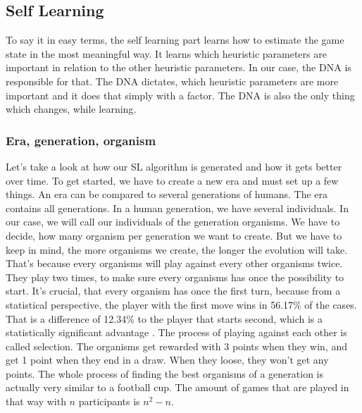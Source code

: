 \subsection{Self Learning} \label{selflearning}
To say it in easy terms, the self learning part learns how to estimate the game state in the most meaningful way. It learns which heuristic parameters are important in relation to the other heuristic parameters. In our case, the \ac{DNA}  is responsible for that. The \ac{DNA} dictates, which heuristic parameters are more important and it does that simply with a factor. The \ac{DNA} is also the only thing which changes, while learning.


\subsubsection{Era, generation, organism}
Let's take a look at how our \ac{SL} algorithm is generated and how it gets better over time.
To get started, we have to create a new \ac{era} and must set up a few things. An era can be compared to several \acp{generation} of humans. 
The era contains all generations. In a human generation, we have several individuals. In our case, we will call our individuals of the generation \acp{organism}. We have to decide, how many organism per generation we want to create. But we have to keep in mind, the more organisms we create, the longer the evolution will take. That's because every organisms will play against every other organisms twice. They play two times, to make sure every organisms has once the possibility to start. It's crucial, that every organism has once the first turn, because from a statistical perspective, the player with the first move wins in 56.17\% of the cases. That is a difference of 12.34\% to the player that starts second, which is a statistically significant advantage \cite{web:tsurel2013}.
The process of playing against each other is called selection. The organisms get rewarded with 3 points when they win, and get 1 point when they end in a draw. When they loose, they won't get any points. The whole process of finding the best organisms of a generation is actually very similar to a football cup.
The amount of games that are played in that way with $n$ participants is $n^2-n$.\\

